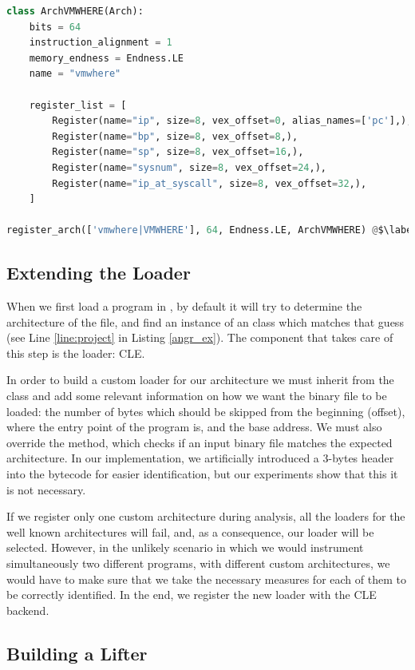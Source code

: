 \begin{lstlisting}[language=python, label={lst:angr_arch}, caption={TODO}]
class ArchVMWHERE(Arch):
    bits = 64
    instruction_alignment = 1
    memory_endness = Endness.LE
    name = "vmwhere"

    register_list = [
        Register(name="ip", size=8, vex_offset=0, alias_names=['pc'],),
        Register(name="bp", size=8, vex_offset=8,),
        Register(name="sp", size=8, vex_offset=16,),
        Register(name="sysnum", size=8, vex_offset=24,),
        Register(name="ip_at_syscall", size=8, vex_offset=32,),
    ]

register_arch(['vmwhere|VMWHERE'], 64, Endness.LE, ArchVMWHERE) @$\label{line:reg_arch}$@
\end{lstlisting}

\subsection{Extending the Loader}

When we first load a program in , by default it will try to determine the architecture of the file, and find an instance of an  class which matches that guess (see Line \ref{line:project} in Listing \ref{angr_ex}). The component that takes care of this step is the loader: \gls{CLE}. 

In order to build a custom loader for our architecture we must inherit from the  class and add some relevant information on how we want the binary file to be loaded: the number of bytes which should be skipped from the beginning (offset), where the entry point of the program is, and the base address. We must also override the  method, which checks if an input binary file matches the expected architecture. In our implementation, we artificially introduced a 3-bytes header into the bytecode for easier identification, but our experiments show that this it is not necessary. 

If we register only one custom architecture during analysis, all the loaders for the well known architectures will fail, and, as a consequence, our loader will be selected. However, in the unlikely scenario in which we would instrument simultaneously two different programs, with different custom architectures, we would have to make sure that we take the necessary measures for each of them to be correctly identified. In the end, we register the new loader with the \gls{CLE} backend.

\subsection{Building a Lifter}

